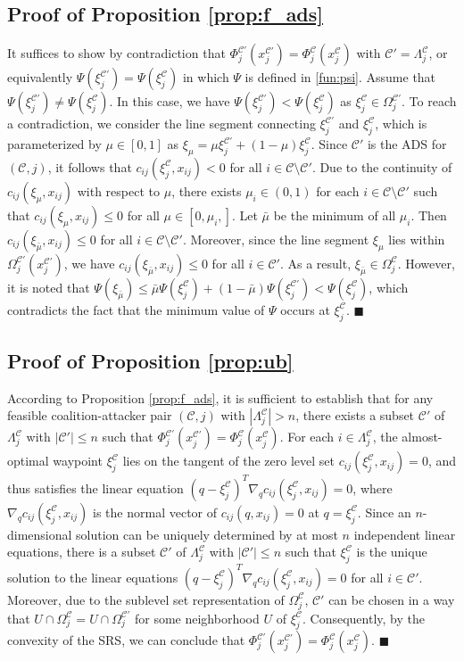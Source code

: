 \documentclass[journal]{IEEEtran}
\newenvironment{Proof}{\noindent{\em Proof:\/}}{\hfill $\blacksquare$\par}
\newcommand{\C}{\mathcal{C}}
\newcommand{\1}{\mathbf{1}}
\begin{document}
\subsection{Proof of Proposition \ref{prop:f_ads}}\label{proof:f_ads}
\begin{Proof}
It suffices to show by contradiction that $\Phi^{\C'}_j(x^{\C'}_j)=\Phi^{\C}_j(x^{\C}_j)$ with $\C'=\Lambda^\C_j$, or equivalently $\Psi(\xi^{\C'}_j)=\Psi(\xi^{\C}_j)$ in which $\Psi$ is defined in \eqref{fun:psi}. Assume that $\Psi(\xi^{\C'}_j)\neq\Psi(\xi^{\C}_j)$. In this case, we have $\Psi(\xi^{\C'}_j)<\Psi(\xi^{\C}_j)$ as $\xi^{\C}_j\in \Omega^{\C'}_j$. To reach a contradiction, we consider the line segment connecting $\xi^{\C'}_j$ and $\xi^{\C}_j$, which is parameterized by $\mu\in [0,1]$ as $\xi_{\mu}=\mu\xi^{\C'}_j+(1-\mu)\xi^{\C}_j$. Since $\C'$ is the ADS for $(\C,j)$, it follows that $c_{ij}(\xi^{\C}_j,x_{ij})<0$ for all $i\in \C\setminus\C'$. Due to the continuity of $c_{ij}(\xi_{\mu},x_{ij})$ with respect to $\mu$, there exists $\mu_i\in (0,1)$ for each $i\in \C\setminus\C'$ such that $c_{ij}(\xi_{\mu},x_{ij})\leq 0$ for all $\mu\in [0,\mu_i,]$. Let $\bar{\mu}$ be the minimum of all $\mu_i$. Then $c_{ij}(\xi_{\bar{\mu}},x_{ij})\leq 0$ for all $i\in \C\setminus\C'$. Moreover, since the line segment $\xi_{\mu}$ lies within $\Omega^{\C'}_j(x^{\C'}_j)$, we have $c_{ij}(\xi_{\bar{\mu}},x_{ij})\leq 0$ for all $i\in \C'$. As a result, $\xi_{\bar{\mu}}\in \Omega^{\C}_j$. However, it is noted that $\Psi(\xi_{\bar{\mu}})\leq \bar{\mu}\Psi(\xi^{\C}_j)+(1-\bar{\mu})\Psi(\xi^{\C'}_j)<\Psi(\xi^{\C}_j)$, which contradicts the fact that the minimum value of $\Psi$ occurs at $\xi^{\C}_j$.
\end{Proof}

\subsection{Proof of Proposition \ref{prop:ub}}\label{proof:ub}
\begin{Proof}
According to Proposition \ref{prop:f_ads}, it is sufficient to establish that for any feasible coalition-attacker pair $(\C,j)$ with $|\Lambda^\C_j|>n$, there exists a subset $\C'$ of $\Lambda^\C_j$ with $|\C'|\leq n$ such that $\Phi^{\C'}_j(x^{\C'}_j)=\Phi^{\C}_j(x^{\C}_j)$. For each $i\in \Lambda^\C_j$, the almost-optimal waypoint $\xi^\C_j$ lies on the tangent of the zero level set $c_{ij}(\xi^\C_j,x_{ij})=0$, and thus satisfies the linear equation $(q-\xi^\C_j)^T\nabla_qc_{ij}(\xi^\C_j,x_{ij})=0$, where $\nabla_qc_{ij}(\xi^\C_j,x_{ij})$ is the normal vector of $c_{ij}(q,x_{ij})=0$ at $q=\xi^\C_j$. Since an $n$-dimensional solution can be uniquely determined by at most $n$ independent linear equations, there is a subset $\C'$ of $\Lambda^\C_j$ with $|\C'|\leq n$ such that $\xi^\C_j$ is the unique solution to the linear equations $(q-\xi^\C_j)^T\nabla_qc_{ij}(\xi^\C_j,x_{ij})=0$ for all $i\in \C'$. Moreover, due to the sublevel set representation of $\Omega^\C_j$, $\C'$ can be chosen in a way that $U\cap \Omega^\C_j=U\cap \Omega^{\C'}_j$ for some neighborhood $U$ of $\xi^\C_j$. Consequently, by the convexity of the SRS, we can conclude that $\Phi^{\C'}_j(x^{\C'}_j)=\Phi^\C_j(x^\C_j)$.
\end{Proof}
\end{document}
